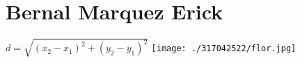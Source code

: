 \chapter{Bernal Marquez Erick}
$ d=\sqrt{{(x_{2}-x_{1})}^{2}+{(y_{2}-y_{1})}^{2}}$
\texttt{[image: ./317042522/flor.jpg]}
